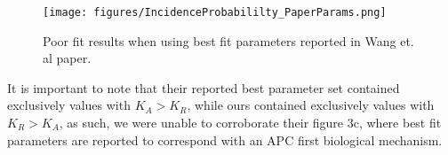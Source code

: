 \begin{figure}[h]
    \centering
    \texttt{[image: figures/IncidenceProbabililty\_PaperParams.png]}
    \caption{Poor fit results when using best fit parameters reported in Wang et. al paper.}
    \label{fig:paper parameters}
\end{figure}
\FloatBarrier
 
It is important to note that their reported best parameter set contained exclusively values with $K_{A} > K_{R}$, while ours contained exclusively values with $K_{R} > K_{A}$, as such, we were unable to corroborate their figure 3c, where best fit parameters are reported to correspond with an APC first biological mechanism. 